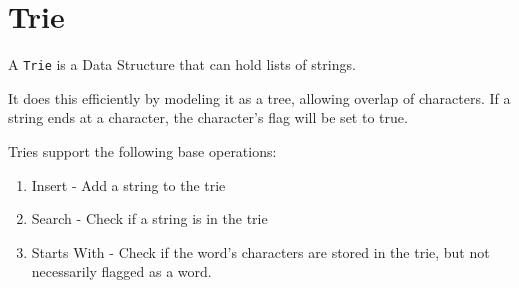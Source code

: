 \section*{Trie}
    A \texttt{Trie} is a Data Structure that can hold lists of strings.

    It does this efficiently by modeling it as a tree, allowing overlap of characters. If a string ends at a character, the character's flag will be set to true.

    Tries support the following base operations:
    \begin{enumerate}
        \item Insert - Add a string to the trie
        \item Search - Check if a string is in the trie
        \item Starts With - Check if the word's characters are stored in the trie, but not necessarily flagged as a word.
    \end{enumerate}
